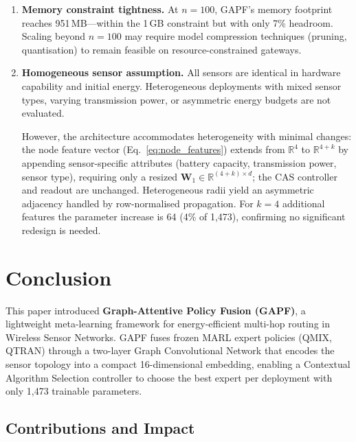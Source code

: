 \documentclass[12pt, onecolumn, journal]{IEEEtran}
\begin{document}
\begin{enumerate}
    \item \textbf{Memory constraint tightness.} At $n{=}100$, GAPF's memory footprint reaches 951\,MB---within the 1\,GB constraint but with only 7\% headroom. Scaling beyond $n{=}100$ may require model compression techniques (pruning, quantisation) to remain feasible on resource-constrained gateways.
    
    \item \textbf{Homogeneous sensor assumption.} All sensors are identical in hardware capability and initial energy. Heterogeneous deployments with mixed sensor types, varying transmission power, or asymmetric energy budgets are not evaluated.
    
    \begin{revision}
    However, the architecture accommodates heterogeneity with minimal changes: the node feature vector (Eq.~\ref{eq:node_features}) extends from $\mathbb{R}^4$ to $\mathbb{R}^{4+k}$ by appending sensor-specific attributes (battery capacity, transmission power, sensor type), requiring only a resized $\mathbf{W}_1 \in \mathbb{R}^{(4+k) \times d}$; the CAS controller and readout are unchanged. Heterogeneous radii yield an asymmetric adjacency handled by row-normalised propagation. For $k{=}4$ additional features the parameter increase is 64 (4\% of 1{,}473), confirming no significant redesign is needed.
    \end{revision}
\end{enumerate}

\FloatBarrier



\section{Conclusion}
\label{sec:conclusion}

This paper introduced \textbf{Graph-Attentive Policy Fusion (GAPF)}, a lightweight meta-learning framework for energy-efficient multi-hop routing in Wireless Sensor Networks. GAPF fuses frozen MARL expert policies (QMIX, QTRAN) through a two-layer Graph Convolutional Network that encodes the sensor topology into a compact 16-dimensional embedding, enabling a Contextual Algorithm Selection controller to choose the best expert per deployment with only 1{,}473 trainable parameters.

\subsection{Contributions and Impact}
\end{document}
